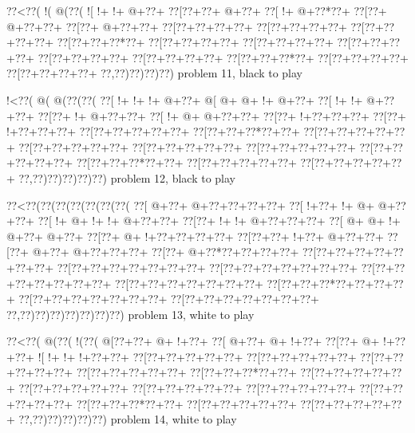 \vbox{\vbox{\goo
\0??<\0??(\- !(\- @(\0??(
\- ![\- !+\- !+\- @+\0??+
\0??[\0??+\0??+\- @+\0??+
\0??[\- !+\- @+\0??*\0??+
\0??[\0??+\- @+\0??+\0??+
\0??[\0??+\- @+\0??+\0??+
\0??[\0??+\0??+\0??+\0??+
\0??[\0??+\0??+\0??+\0??+
\0??[\0??+\0??+\0??+\0??+
\0??[\0??+\0??+\0??*\0??+
\0??[\0??+\0??+\0??+\0??+
\0??[\0??+\0??+\0??+\0??+
\0??[\0??+\0??+\0??+\0??+
\0??[\0??+\0??+\0??+\0??+
\0??[\0??+\0??+\0??+\0??+
\0??[\0??+\0??+\0??*\0??+
\0??[\0??+\0??+\0??+\0??+
\0??[\0??+\0??+\0??+\0??+
\0??,\0??)\0??)\0??)\0??)
}
\hfil problem 11, black to play\hfil\break
}

\vbox{\vbox{\goo
\- !<\0??(\- @(\- @(\0??(\0??(
\0??[\- !+\- !+\- !+\- @+\0??+
\- @[\- @+\- @+\- !+\- @+\0??+
\0??[\- !+\- !+\- @+\0??+\0??+
\0??[\0??+\- !+\- @+\0??+\0??+
\0??[\- !+\- @+\- @+\0??+\0??+
\0??[\0??+\- !+\0??+\0??+\0??+
\0??[\0??+\- !+\0??+\0??+\0??+
\0??[\0??+\0??+\0??+\0??+\0??+
\0??[\0??+\0??+\0??*\0??+\0??+
\0??[\0??+\0??+\0??+\0??+\0??+
\0??[\0??+\0??+\0??+\0??+\0??+
\0??[\0??+\0??+\0??+\0??+\0??+
\0??[\0??+\0??+\0??+\0??+\0??+
\0??[\0??+\0??+\0??+\0??+\0??+
\0??[\0??+\0??+\0??*\0??+\0??+
\0??[\0??+\0??+\0??+\0??+\0??+
\0??[\0??+\0??+\0??+\0??+\0??+
\0??,\0??)\0??)\0??)\0??)\0??)
}
\hfil problem 12, black to play\hfil\break
}

\vbox{\vbox{\goo
\0??<\0??(\0??(\0??(\0??(\0??(\0??(\0??(
\0??[\- @+\0??+\- @+\0??+\0??+\0??+\0??+
\0??[\- !+\0??+\- !+\- @+\- @+\0??+\0??+
\0??[\- !+\- @+\- !+\- !+\- @+\0??+\0??+
\0??[\0??+\- !+\- !+\- @+\0??+\0??+\0??+
\0??[\- @+\- @+\- !+\- @+\0??+\- @+\0??+
\0??[\0??+\- @+\- !+\0??+\0??+\0??+\0??+
\0??[\0??+\0??+\- !+\0??+\- @+\0??+\0??+
\0??[\0??+\- @+\0??+\- @+\0??+\0??+\0??+
\0??[\0??+\- @+\0??*\0??+\0??+\0??+\0??+
\0??[\0??+\0??+\0??+\0??+\0??+\0??+\0??+
\0??[\0??+\0??+\0??+\0??+\0??+\0??+\0??+
\0??[\0??+\0??+\0??+\0??+\0??+\0??+\0??+
\0??[\0??+\0??+\0??+\0??+\0??+\0??+\0??+
\0??[\0??+\0??+\0??+\0??+\0??+\0??+\0??+
\0??[\0??+\0??+\0??*\0??+\0??+\0??+\0??+
\0??[\0??+\0??+\0??+\0??+\0??+\0??+\0??+
\0??[\0??+\0??+\0??+\0??+\0??+\0??+\0??+
\0??,\0??)\0??)\0??)\0??)\0??)\0??)\0??)
}
\hfil problem 13, white to play\hfil\break
}

\vbox{\vbox{\goo
\0??<\0??(\- @(\0??(\- !(\0??(
\- @[\0??+\0??+\- @+\- !+\0??+
\0??[\- @+\0??+\- @+\- !+\0??+
\0??[\0??+\- @+\- !+\0??+\0??+
\- ![\- !+\- !+\- !+\0??+\0??+
\0??[\0??+\0??+\0??+\0??+\0??+
\0??[\0??+\0??+\0??+\0??+\0??+
\0??[\0??+\0??+\0??+\0??+\0??+
\0??[\0??+\0??+\0??+\0??+\0??+
\0??[\0??+\0??+\0??*\0??+\0??+
\0??[\0??+\0??+\0??+\0??+\0??+
\0??[\0??+\0??+\0??+\0??+\0??+
\0??[\0??+\0??+\0??+\0??+\0??+
\0??[\0??+\0??+\0??+\0??+\0??+
\0??[\0??+\0??+\0??+\0??+\0??+
\0??[\0??+\0??+\0??*\0??+\0??+
\0??[\0??+\0??+\0??+\0??+\0??+
\0??[\0??+\0??+\0??+\0??+\0??+
\0??,\0??)\0??)\0??)\0??)\0??)
}
\hfil problem 14, white to play\hfil\break
}

